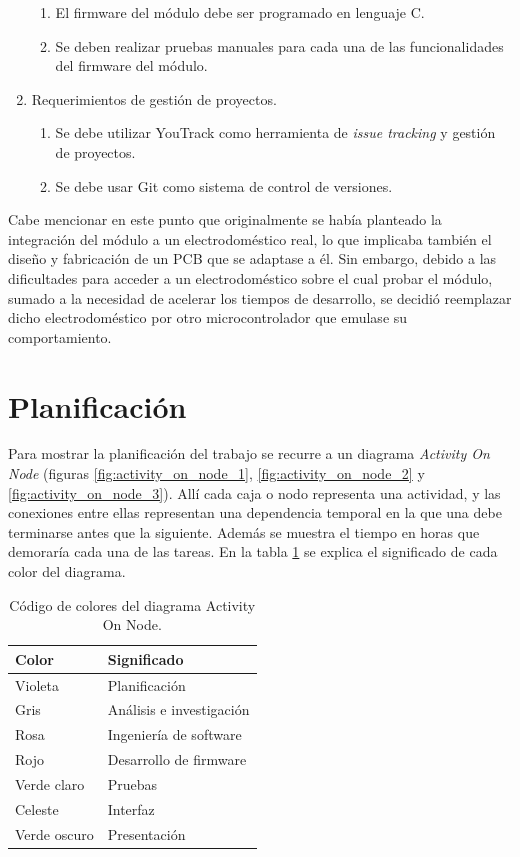 \begin{enumerate}
	\begin{enumerate}
		\item El firmware del módulo debe ser programado en lenguaje C.
		\item Se deben realizar pruebas manuales para cada una de las funcionalidades del firmware del módulo.
	\end{enumerate}
	\item Requerimientos de gestión de proyectos.
	\begin{enumerate}
		\item Se debe utilizar YouTrack \citep{youtrack} como herramienta de \emph{issue tracking} y gestión de proyectos.
		\item Se debe usar Git como sistema de control de versiones.
	\end{enumerate}
\end{enumerate}

Cabe mencionar en este punto que originalmente se había planteado la integración del módulo a un electrodoméstico real, lo que implicaba también el diseño y fabricación de un PCB que se adaptase a él. Sin embargo, debido a las dificultades para acceder a un electrodoméstico sobre el cual probar el módulo, sumado a la necesidad de acelerar los tiempos de desarrollo, se decidió reemplazar dicho electrodoméstico por otro microcontrolador que emulase su comportamiento.


\section{Planificación}

Para mostrar la planificación del trabajo se recurre a un diagrama \emph{Activity On Node} (figuras \ref{fig:activity_on_node_1}, \ref{fig:activity_on_node_2} y \ref{fig:activity_on_node_3}). Allí cada caja o nodo representa una actividad, y las conexiones entre ellas representan una dependencia temporal en la que una debe terminarse antes que la siguiente. Además se muestra el tiempo en horas que demoraría cada una de las tareas. En la tabla \ref{tab:codigo_colores} se explica el significado de cada color del diagrama.

\begin{table}[h]
	\centering
	\caption{Código de colores del diagrama Activity On Node.}
	\begin{tabular}{l l}    
		\toprule
		\textbf{Color}	& \textbf{Significado}	\\
		\midrule
		Violeta			& Planificación						\\
		Gris			& Análisis e investigación									\\
		Rosa			& Ingeniería de software									\\
		Rojo			& Desarrollo de firmware									\\
		Verde claro			& Pruebas									\\
		Celeste 		& Interfaz									\\
		Verde oscuro 			& Presentación									\\
		\bottomrule
		\hline
	\end{tabular}
	\label{tab:codigo_colores}
\end{table}

